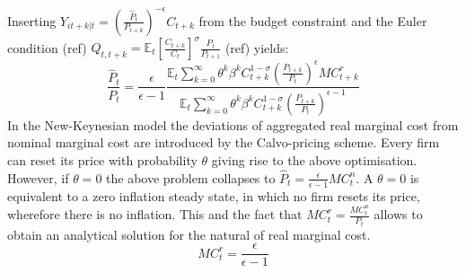 \documentclass[12pt,a4paper,english]{article} %
\newcommand{\E}{\mathbb{E}} %
\begin{document}
	Inserting $Y_{it+k|t} = \left(\frac{\hat{P}_t}{P_{t+k}} \right)^{-\epsilon} C_{t+k}$ from the budget constraint and the Euler condition (ref) $Q_{t,t+k} = \E_t \left[ \frac{C_{t+k}}{C_t} \right]^\sigma \frac{P_t}{P_{t+1}}$ (ref) yields:
	\begin{equation}
		\frac{\hat{P}_t}{P_t} = \frac{\epsilon}{\epsilon-1} 
		\frac{
		\E_t \sum_{k=0}^{\infty} \theta^k \beta^k C_{t+k}^{1-\sigma} (\frac{P_{t+k}}{P_t})^\epsilon MC_{t+k}^r
		}{
		\E_t \sum_{k=0}^{\infty} \theta^k \beta^k C_{t+k}^{1-\sigma} (\frac{P_{t+k}}{P_t})^{\epsilon-1}
		}
	\end{equation}
	In the New-Keynesian model the deviations of aggregated real marginal cost from nominal marginal cost are introduced by the Calvo-pricing scheme. Every firm can reset its price with probability $\theta$ giving rise to the above optimisation. However, if $\theta=0$ the above problem collapses to $\hat{P}_t = \frac{\epsilon}{\epsilon-1} MC_t^n$. A $\theta=0$ is equivalent to a zero inflation steady state, in which no firm resets its price, wherefore there is no inflation. This and the fact that $MC_t^r = \frac{MC_t^n}{P_t}$ allows to obtain an analytical solution for the natural of real marginal cost. 
	\begin{equation}
		MC_t^r = \frac{\epsilon}{\epsilon-1}
	\end{equation} 
	
	
\end{document}
